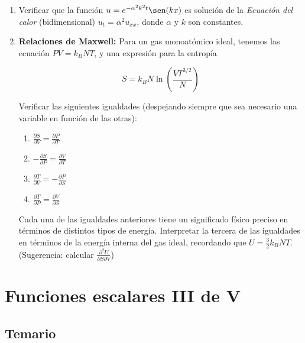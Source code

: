 \documentclass[11pt]{book}
\theoremstyle{definicion}
\theoremstyle{teorema}
\theoremstyle{ejemplo}
\begin{document}
\begin{enumerate}
\begin{itemize}
  \item[c)] $u=\ln\sqrt{x^2+y^2}$

    \item[d)] $u=e^{-x}\cos y-e^{-y}\cos x$ 
    \end{itemize}
\item Verificar que la función $u=e^{-\alpha^2k^2t}\sen(kx)$ es solución de la \emph{Ecuación del calor} (bidimensional) $u_t=\alpha^2u_{xx}$, donde $\alpha$ y $k$ son constantes. 

\item \textbf{Relaciones de Maxwell:} Para un gas monoatómico ideal, tenemos las ecuación $PV = k_B NT$, y una expresión para la entropía

\[
S = k_B N \ln \left( \frac{V T^{3/2}}{N} \right)
\]

Verificar las siguientes igualdades (despejando siempre que sea necesario una variable en función de las otras):

\begin{enumerate}
\item $\frac{\partial S}{\partial V} = \frac{\partial P}{\partial T}$
\item $-\frac{\partial S}{\partial P} = \frac{\partial V}{\partial T}$
\item $\frac{\partial T}{\partial V} = - \frac{\partial P}{\partial S}$
\item $\frac{\partial T}{\partial P} = \frac{\partial V}{\partial S}$
\end{enumerate}

Cada una de las igualdades anteriores tiene un significado físico preciso en términos de distintos tipos de energía. Interpretar 
la tercera de las igualdades en términos de la energía interna del gas ideal, recordando que $U = \frac{3}{2} k_B N T$. 
(Sugerencia: calcular $\frac{\partial^2 U}{\partial S \partial V}$)
    
\end{enumerate}

\chapter{Funciones escalares III de V}

\section{Temario}
\end{document}
